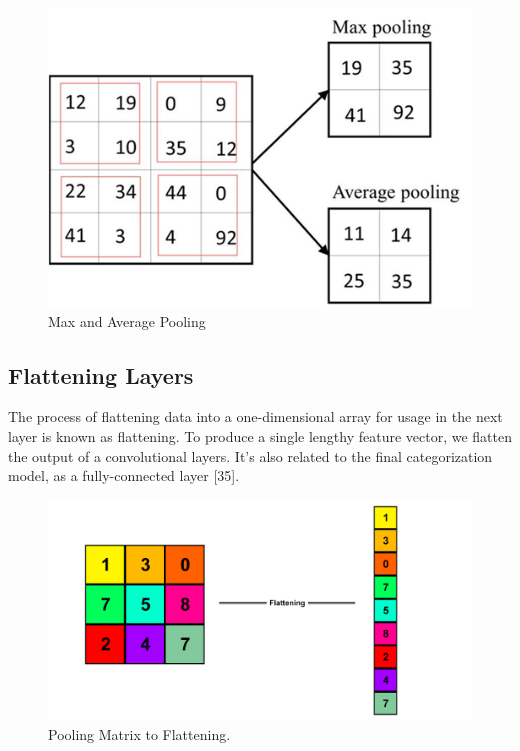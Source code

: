 \vspace{5mm}
\begin{figure}[hbt!]
\centering
\includegraphics[scale=1]{images/fig-21.png}
\caption{Max and Average Pooling}
\label{fig:x Max and Average Pooling}
\end{figure}

\vspace{5mm}
\subsection{Flattening Layers}

\vspace{5mm}
The process of flattening data into a one-dimensional array for usage in the next layer is known as flattening. To produce a single lengthy feature vector, we flatten the output of a convolutional layers. It's also related to the final categorization model, as a fully-connected layer [35].

\vspace{5mm}
\begin{figure}[hbt!]
\centering
\includegraphics[scale=0.5]{images/Pooling Matrix to Flattening..png}
\caption{Pooling Matrix to Flattening.}
\label{fig:x Pooling Matrix to Flattening}
\end{figure}

